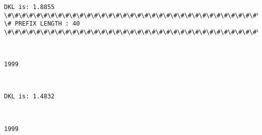 \documentclass[11pt]{article}
\begin{document}
    \begin{Verbatim}[commandchars=\\\{\}]
DKL is: 1.8855
\#\#\#\#\#\#\#\#\#\#\#\#\#\#\#\#\#\#\#\#\#\#\#\#\#\#\#\#\#\#\#\#\#\#\#\#\#\#\#\#\#\#\#\#\#\#\#\#\#\#\#\#\#\#\#\#\#\#\#\#\#\#\#\#\#\#\#\#\#\#\#\#\#\#\#\#
\# PREFIX LENGTH : 40
\#\#\#\#\#\#\#\#\#\#\#\#\#\#\#\#\#\#\#\#\#\#\#\#\#\#\#\#\#\#\#\#\#\#\#\#\#\#\#\#\#\#\#\#\#\#\#\#\#\#\#\#\#\#\#\#\#\#\#\#\#\#\#\#\#\#\#\#\#\#\#\#\#\#\#\#

    \end{Verbatim}

    \begin{center}
    \end{center}
    { \hspace*{\fill} \\}
    
    \begin{Verbatim}[commandchars=\\\{\}]
1999

    \end{Verbatim}

    \begin{center}
    \end{center}
    { \hspace*{\fill} \\}
    
    \begin{Verbatim}[commandchars=\\\{\}]
DKL is: 1.4832

    \end{Verbatim}

    \begin{center}
    \end{center}
    { \hspace*{\fill} \\}
    
    \begin{Verbatim}[commandchars=\\\{\}]
1999

    \end{Verbatim}

    \begin{center}
    \end{center}
    { \hspace*{\fill} \\}
    
\end{document}
